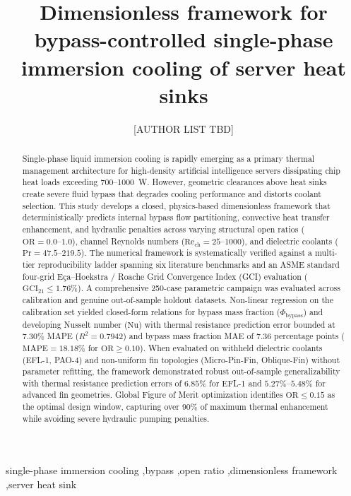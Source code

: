 \documentclass[preprint,12pt]{elsarticle}
\begin{document}
\begin{frontmatter}

\title{Dimensionless framework for bypass-controlled single-phase immersion cooling of server heat sinks}

\author{[AUTHOR LIST TBD]}
\address{[AFFILIATION TBD]}

\begin{abstract}
Single-phase liquid immersion cooling is rapidly emerging as a primary thermal management architecture for high-density artificial intelligence servers dissipating chip heat loads exceeding 700--1000~W. However, geometric clearances above heat sinks create severe fluid bypass that degrades cooling performance and distorts coolant selection. This study develops a closed, physics-based dimensionless framework that deterministically predicts internal bypass flow partitioning, convective heat transfer enhancement, and hydraulic penalties across varying structural open ratios ($\mathrm{OR} = 0.0\text{--}1.0$), channel Reynolds numbers ($\mathrm{Re}_{\mathrm{ch}} = 25\text{--}1000$), and dielectric coolants ($\mathrm{Pr} = 47.5\text{--}219.5$). The numerical framework is systematically verified against a multi-tier reproducibility ladder spanning six literature benchmarks and an ASME standard four-grid E\c{c}a--Hoekstra / Roache Grid Convergence Index (GCI) evaluation ($\mathrm{GCI}_{21} \le 1.76\%$). A comprehensive 250-case parametric campaign was evaluated across calibration and genuine out-of-sample holdout datasets. Non-linear regression on the calibration set yielded closed-form relations for bypass mass fraction ($\Phi_{\mathrm{bypass}}$) and developing Nusselt number ($\mathrm{Nu}$) with thermal resistance prediction error bounded at $7.30\%$ MAPE ($R^2 = 0.7942$) and bypass mass fraction MAE of $7.36$ percentage points ($\mathrm{MAPE} = 18.18\%$ for $\mathrm{OR} \ge 0.10$). When evaluated on withheld dielectric coolants (EFL-1, PAO-4) and non-uniform fin topologies (Micro-Pin-Fin, Oblique-Fin) without parameter refitting, the framework demonstrated robust out-of-sample generalizability with thermal resistance prediction errors of $6.85\%$ for EFL-1 and $5.27\%\text{--}5.48\%$ for advanced fin geometries. Global Figure of Merit optimization identifies $\mathrm{OR} \le 0.15$ as the optimal design window, capturing over $90\%$ of maximum thermal enhancement while avoiding severe hydraulic pumping penalties.
\end{abstract}

\begin{keyword}
single-phase immersion cooling \sep bypass \sep open ratio \sep dimensionless framework \sep server heat sink
\end{keyword}

\end{frontmatter}
\end{document}

